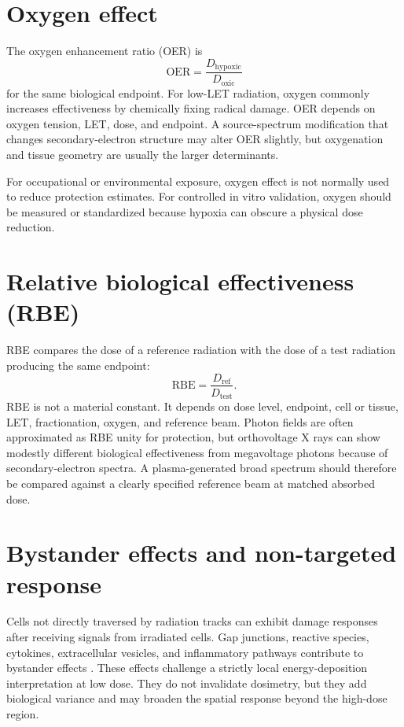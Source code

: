 \section{Oxygen effect}

The oxygen enhancement ratio (OER) is
\begin{equation}
\mathrm{OER}=\frac{D_{\mathrm{hypoxic}}}{D_{\mathrm{oxic}}}
\end{equation}
for the same biological endpoint. For low-LET radiation, oxygen commonly increases effectiveness by chemically fixing radical damage. OER depends on oxygen tension, LET, dose, and endpoint. A source-spectrum modification that changes secondary-electron structure may alter OER slightly, but oxygenation and tissue geometry are usually the larger determinants.

For occupational or environmental exposure, oxygen effect is not normally used to reduce protection estimates. For controlled in vitro validation, oxygen should be measured or standardized because hypoxia can obscure a physical dose reduction.

\section{Relative biological effectiveness (RBE)}

RBE compares the dose of a reference radiation with the dose of a test radiation producing the same endpoint:
\begin{equation}
\mathrm{RBE}=\frac{D_{\mathrm{ref}}}{D_{\mathrm{test}}}.
\label{eq:rbe}
\end{equation}
RBE is not a material constant. It depends on dose level, endpoint, cell or tissue, LET, fractionation, oxygen, and reference beam. Photon fields are often approximated as RBE unity for protection, but orthovoltage X rays can show modestly different biological effectiveness from megavoltage photons because of secondary-electron spectra. A plasma-generated broad spectrum should therefore be compared against a clearly specified reference beam at matched absorbed dose.

\section{Bystander effects and non-targeted response}

Cells not directly traversed by radiation tracks can exhibit damage responses after receiving signals from irradiated cells. Gap junctions, reactive species, cytokines, extracellular vesicles, and inflammatory pathways contribute to bystander effects \cite{nagasawa1992,morgan2003,azzam2003,prise2009}. These effects challenge a strictly local energy-deposition interpretation at low dose. They do not invalidate dosimetry, but they add biological variance and may broaden the spatial response beyond the high-dose region.


